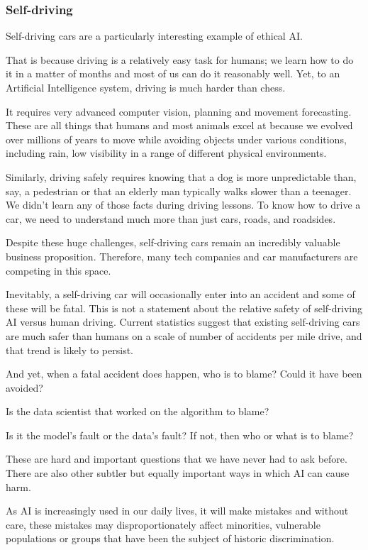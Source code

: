 \documentclass[
]{book}
\theoremstyle{definition}
\theoremstyle{definition}
\theoremstyle{definition}
\theoremstyle{definition}
\theoremstyle{remark}
\begin{document}
\hypertarget{self-driving}{%
\subsubsection{Self-driving}\label{self-driving}}

Self-driving cars are a particularly interesting example of ethical AI.

That is because driving is a relatively easy task for humans; we learn how to do it in a matter of months and most of us can do it reasonably well. Yet, to an Artificial Intelligence system, driving is much harder than chess.

It requires very advanced computer vision, planning and movement forecasting.
These are all things that humans and most animals excel at because we evolved
over millions of years to move while avoiding objects under various conditions,
including rain, low visibility in a range of different physical environments.

Similarly, driving safely requires knowing that a dog is more unpredictable than,
say, a pedestrian or that an elderly man typically walks slower than a teenager. We didn't learn any of those facts during driving lessons. To know how to drive
a car, we need to understand much more than just cars, roads, and roadsides.

Despite these huge challenges, self-driving cars remain an incredibly valuable business proposition. Therefore, many tech companies and car manufacturers are competing in this space.

Inevitably, a self-driving car will occasionally enter into an accident and
some of these will be fatal. This is not a statement about the relative
safety of self-driving AI versus human driving. Current statistics suggest that
existing self-driving cars are much safer than humans on a scale of number of accidents per mile drive, and that trend is likely to persist.

And yet, when a fatal accident does happen, who is to blame? Could it have been avoided?

Is the data scientist that worked on the algorithm to blame?

Is it the model's fault or the data's fault? If not, then who or what is to blame?

These are hard and important questions that we have never had to ask before. There are also other subtler but equally important ways in which AI can cause harm.

As AI is increasingly used in our daily lives, it will make mistakes and without care, these mistakes may disproportionately affect minorities, vulnerable populations or groups that have been the subject
of historic discrimination.
\end{document}
